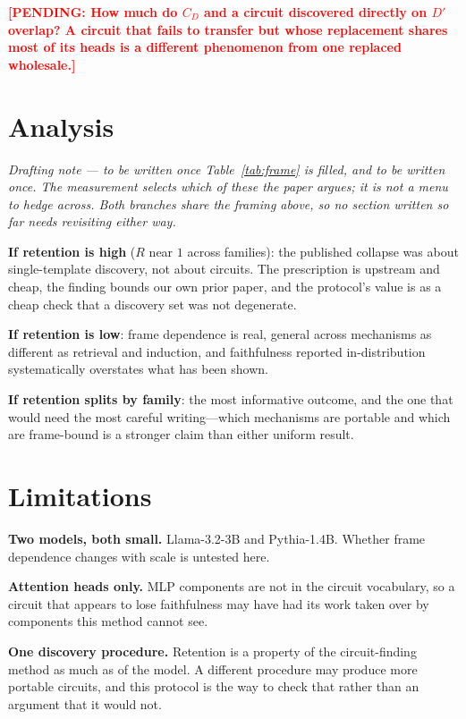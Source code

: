 \documentclass[11pt,a4paper]{article}
\newcounter{pendingcount}
\DeclareRobustCommand{\pending}[1]{\stepcounter{pendingcount}%
  \textcolor{red}{\textbf{[PENDING: #1]}}}
\begin{document}
\pending{How much do $C_D$ and a circuit discovered directly on $D'$ overlap? A
circuit that fails to transfer but whose replacement shares most of its heads is a
different phenomenon from one replaced wholesale.}

\section{Analysis}
\label{sec:analysis}

\emph{Drafting note --- to be written once Table~\ref{tab:frame} is filled, and to be
written once. The measurement selects which of these the paper argues; it is not a
menu to hedge across. Both branches share the framing above, so no section written so
far needs revisiting either way.}

\textbf{If retention is high} ($R$ near $1$ across families): the published collapse
was about single-template discovery, not about circuits. The prescription is upstream
and cheap, the finding bounds our own prior paper, and the protocol's value is as a
cheap check that a discovery set was not degenerate.

\textbf{If retention is low}: frame dependence is real, general across mechanisms as
different as retrieval and induction, and faithfulness reported in-distribution
systematically overstates what has been shown.

\textbf{If retention splits by family}: the most informative outcome, and the one that
would need the most careful writing---which mechanisms are portable and which are
frame-bound is a stronger claim than either uniform result.

\section{Limitations}
\label{sec:limitations}

\textbf{Two models, both small.} Llama-3.2-3B and Pythia-1.4B. Whether frame
dependence changes with scale is untested here.

\textbf{Attention heads only.} MLP components are not in the circuit vocabulary, so a
circuit that appears to lose faithfulness may have had its work taken over by
components this method cannot see.

\textbf{One discovery procedure.} Retention is a property of the circuit-finding
method as much as of the model. A different procedure may produce more portable
circuits, and this protocol is the way to check that rather than an argument that it
would not.
\end{document}
